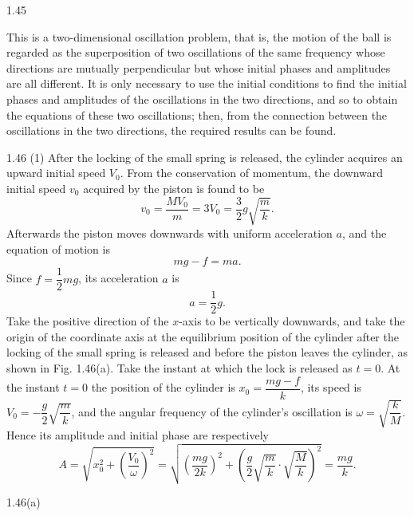 \begin{solution}{1.45}
\begin{commentary}
This is a two-dimensional oscillation problem, that is, the motion of the ball is regarded as the superposition of two oscillations of the same frequency whose directions are mutually perpendicular but whose initial phases and amplitudes are all different. It is only necessary to use the initial conditions to find the initial phases and amplitudes of the oscillations in the two directions, and so to obtain the equations of these two oscillations; then, from the connection between the oscillations in the two directions, the required results can be found.
\end{commentary}
\end{solution}

\begin{solution}{1.46}
(1) After the locking of the small spring is released, the cylinder acquires an upward initial speed $V_0$. From the conservation of momentum, the downward initial speed $v_0$ acquired by the piston is found to be
\[
v_0=\frac{MV_0}{m}=3V_0=\frac{3}{2}g\sqrt{\frac{m}{k}}.
\]
Afterwards the piston moves downwards with uniform acceleration $a$, and the equation of motion is
\[
mg-f=ma.
\]
Since $f=\dfrac{1}{2}mg$, its acceleration $a$ is
\[
a=\frac{1}{2}g.
\]
Take the positive direction of the $x$-axis to be vertically downwards, and take the origin of the coordinate axis at the equilibrium position of the cylinder after the locking of the small spring is released and before the piston leaves the cylinder, as shown in Fig. 1.46(a). Take the instant at which the lock is released as $t=0$. At the instant $t=0$ the position of the cylinder is $x_0=\dfrac{mg-f}{k}$, its speed is $V_0=-\dfrac{g}{2}\sqrt{\dfrac{m}{k}}$, and the angular frequency of the cylinder's oscillation is $\omega=\sqrt{\dfrac{k}{M}}$. Hence its amplitude and initial phase are respectively
\[
A=\sqrt{x_0^2+\left(\frac{V_0}{\omega}\right)^2}
=\sqrt{\left(\frac{mg}{2k}\right)^2+\left(\frac{g}{2}\sqrt{\frac{m}{k}}\cdot\sqrt{\frac{M}{k}}\right)^2}
=\frac{mg}{k}.
\]

\begin{figbox}{1.46(a)}
\end{figbox}


\end{solution}

